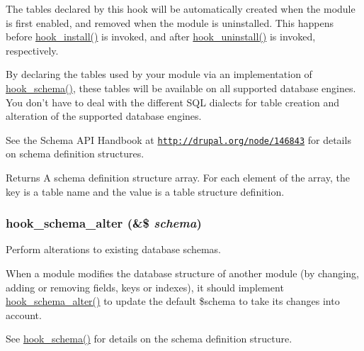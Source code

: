The tables declared by this hook will be automatically created when the module is first enabled, and removed when the module is uninstalled. This happens before \hyperlink{group__hooks_ga1ecdb5a2a046ea63dc790c3ed90338e5}{hook\_\-install()} is invoked, and after \hyperlink{group__hooks_ga3fb24f6923b3e585d6326ff5abdcc57c}{hook\_\-uninstall()} is invoked, respectively.

By declaring the tables used by your module via an implementation of \hyperlink{group__schemaapi_ga9abd926ddaf68a22e6dca28a25d0c6f5}{hook\_\-schema()}, these tables will be available on all supported database engines. You don't have to deal with the different SQL dialects for table creation and alteration of the supported database engines.

See the Schema API Handbook at \href{http://drupal.org/node/146843}{\tt http://drupal.org/node/146843} for details on schema definition structures.

\begin{DoxyReturn}{Returns}
A schema definition structure array. For each element of the array, the key is a table name and the value is a table structure definition. 
\end{DoxyReturn}
\hypertarget{group__schemaapi_ga4a00aaeabd6903f707d8385476b9ae2a}{
\subsubsection[{hook\_\-schema\_\-alter}]{\setlength{\rightskip}{0pt plus 5cm}hook\_\-schema\_\-alter (\&\$ {\em schema})}}
\label{group__schemaapi_ga4a00aaeabd6903f707d8385476b9ae2a}
Perform alterations to existing database schemas.

When a module modifies the database structure of another module (by changing, adding or removing fields, keys or indexes), it should implement \hyperlink{group__schemaapi_ga4a00aaeabd6903f707d8385476b9ae2a}{hook\_\-schema\_\-alter()} to update the default \$schema to take its changes into account.

See \hyperlink{group__schemaapi_ga9abd926ddaf68a22e6dca28a25d0c6f5}{hook\_\-schema()} for details on the schema definition structure.



